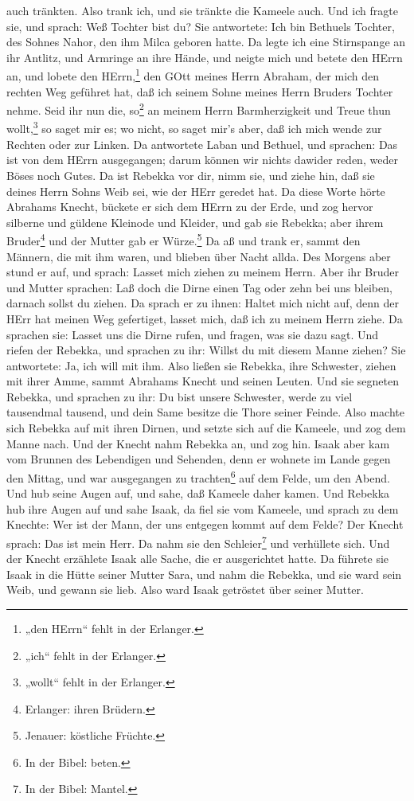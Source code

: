 auch tränkten. Also trank ich, und sie tränkte die Kameele auch. Und ich fragte sie, und sprach: Weß Tochter bist du? Sie antwortete: Ich bin Bethuels Tochter, des Sohnes Nahor, den ihm Milca geboren hatte. Da legte ich eine Stirnspange an ihr Antlitz, und Armringe an ihre Hände, und neigte mich und betete den HErrn an, und lobete den HErrn,\footnote{„den HErrn“ fehlt in der Erlanger.} den GOtt meines Herrn Abraham, der mich den rechten Weg geführet hat, daß ich seinem Sohne meines Herrn Bruders Tochter nehme. Seid ihr nun die, so\footnote{„ich“ fehlt in der Erlanger.} an meinem Herrn Barmherzigkeit und Treue thun wollt,\footnote{„wollt“ fehlt in der Erlanger.} so saget mir es; wo nicht, so saget mir’s aber, daß ich mich wende zur Rechten oder zur Linken. Da antwortete Laban und Bethuel, und sprachen: Das ist von dem HErrn ausgegangen; darum können wir nichts dawider reden, weder Böses noch Gutes. Da ist Rebekka vor dir, nimm sie, und ziehe hin, daß sie deines Herrn Sohns Weib sei, wie der HErr geredet hat. Da diese Worte hörte Abrahams Knecht, bückete er sich dem HErrn zu der Erde, und zog hervor silberne und güldene Kleinode und Kleider, und gab sie Rebekka; aber ihrem Bruder\footnote{Erlanger: ihren Brüdern.} und der Mutter gab er Würze.\footnote{Jenauer: köstliche Früchte.} Da aß und trank er, sammt den Männern, die mit ihm waren, und blieben über Nacht allda. Des Morgens aber stund er auf, und sprach: Lasset mich ziehen zu meinem Herrn. Aber ihr Bruder und Mutter sprachen: Laß doch die Dirne einen Tag oder zehn bei uns bleiben, darnach sollst du ziehen. Da sprach er zu ihnen: Haltet mich nicht auf, denn der HErr hat meinen Weg gefertiget, lasset mich, daß ich zu meinem Herrn ziehe. Da sprachen sie: Lasset uns die Dirne rufen, und fragen, was sie dazu sagt. Und riefen der Rebekka, und sprachen zu ihr: Willst du mit diesem Manne ziehen? Sie antwortete: Ja, ich will mit ihm. Also ließen sie Rebekka, ihre Schwester, ziehen mit ihrer Amme, sammt Abrahams Knecht und seinen Leuten. Und sie segneten Rebekka, und sprachen zu ihr: Du bist unsere Schwester, werde zu viel tausendmal tausend, und dein Same besitze die Thore seiner Feinde. Also machte sich Rebekka auf mit ihren Dirnen, und setzte sich auf die Kameele, und zog dem Manne nach. Und der Knecht nahm Rebekka an, und zog hin. Isaak aber kam vom Brunnen des Lebendigen und Sehenden, denn er wohnete im Lande gegen den Mittag, und war ausgegangen zu trachten\footnote{In der Bibel: beten.} auf dem Felde, um den Abend. Und hub seine Augen auf, und sahe, daß Kameele daher kamen. Und Rebekka hub ihre Augen auf und sahe Isaak, da fiel sie vom Kameele, und sprach zu dem Knechte: Wer ist der Mann, der uns entgegen kommt auf dem Felde? Der Knecht sprach: Das ist mein Herr. Da nahm sie den Schleier\footnote{In der Bibel: Mantel.} und verhüllete sich. Und der Knecht erzählete Isaak alle Sache, die er ausgerichtet hatte. Da führete sie Isaak in die Hütte seiner Mutter Sara, und nahm die Rebekka, und sie ward sein Weib, und gewann sie lieb. Also ward Isaak getröstet über seiner Mutter.

